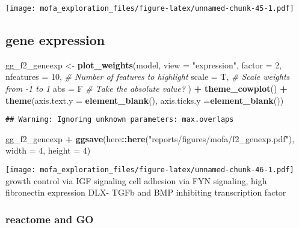 \documentclass[
]{article}
\newenvironment{Shaded}{\begin{snugshade}}{\end{snugshade}}
\newcommand{\CommentTok}[1]{\textcolor[rgb]{0.56,0.35,0.01}{\textit{#1}}}
\newcommand{\DataTypeTok}[1]{\textcolor[rgb]{0.13,0.29,0.53}{#1}}
\newcommand{\DecValTok}[1]{\textcolor[rgb]{0.00,0.00,0.81}{#1}}
\newcommand{\KeywordTok}[1]{\textcolor[rgb]{0.13,0.29,0.53}{\textbf{#1}}}
\newcommand{\NormalTok}[1]{#1}
\newcommand{\OperatorTok}[1]{\textcolor[rgb]{0.81,0.36,0.00}{\textbf{#1}}}
\newcommand{\StringTok}[1]{\textcolor[rgb]{0.31,0.60,0.02}{#1}}
\begin{document}
\texttt{[image: mofa\_exploration\_files/figure-latex/unnamed-chunk-45-1.pdf]}

\hypertarget{gene-expression-1}{%
\subsection{gene expression}\label{gene-expression-1}}

\begin{Shaded}
\begin{Highlighting}[]
\NormalTok{gg_f2_geneexp <-}\StringTok{ }\KeywordTok{plot_weights}\NormalTok{(model,}
  \DataTypeTok{view =} \StringTok{"expression"}\NormalTok{,}
  \DataTypeTok{factor =} \DecValTok{2}\NormalTok{,}
  \DataTypeTok{nfeatures =} \DecValTok{10}\NormalTok{,     }\CommentTok{# Number of features to highlight}
  \DataTypeTok{scale =}\NormalTok{ T,          }\CommentTok{# Scale weights from -1 to 1}
  \DataTypeTok{abs =}\NormalTok{ F             }\CommentTok{# Take the absolute value?}
\NormalTok{) }\OperatorTok{+}\StringTok{ }
\StringTok{  }\KeywordTok{theme_cowplot}\NormalTok{() }\OperatorTok{+}\StringTok{ }
\StringTok{  }\KeywordTok{theme}\NormalTok{(}\DataTypeTok{axis.text.y =} \KeywordTok{element_blank}\NormalTok{(),}
        \DataTypeTok{axis.ticks.y =}\KeywordTok{element_blank}\NormalTok{()) }
\end{Highlighting}
\end{Shaded}

\begin{verbatim}
## Warning: Ignoring unknown parameters: max.overlaps
\end{verbatim}

\begin{Shaded}
\begin{Highlighting}[]
\NormalTok{gg_f2_geneexp }\OperatorTok{+}\StringTok{ }
\StringTok{  }\KeywordTok{ggsave}\NormalTok{(here}\OperatorTok{::}\KeywordTok{here}\NormalTok{(}\StringTok{"reports/figures/mofa/f2_genexp.pdf"}\NormalTok{), }\DataTypeTok{width =} \DecValTok{4}\NormalTok{, }\DataTypeTok{height =} \DecValTok{4}\NormalTok{)}
\end{Highlighting}
\end{Shaded}

\texttt{[image: mofa\_exploration\_files/figure-latex/unnamed-chunk-46-1.pdf]}
growth control via IGF signaling cell adhesion via FYN signaling, high
fibronectin expression DLX- TGFb and BMP inhibiting transcription factor

\hypertarget{reactome-and-go}{%
\subsubsection{reactome and GO}\label{reactome-and-go}}
\end{document}
